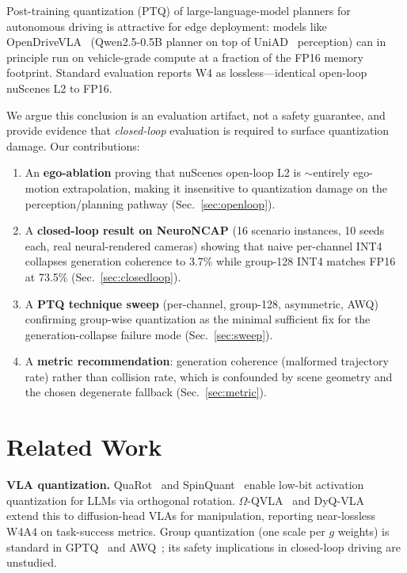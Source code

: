 \documentclass[conference]{IEEEtran}
\begin{document}
Post-training quantization (PTQ) of large-language-model planners for autonomous driving is
attractive for edge deployment: models like OpenDriveVLA~\cite{opendrivevla} (Qwen2.5-0.5B
planner on top of UniAD~\cite{uniad} perception) can in principle run on vehicle-grade compute at
a fraction of the FP16 memory footprint. Standard evaluation reports W4 as lossless---identical
open-loop nuScenes L2 to FP16.

We argue this conclusion is an evaluation artifact, not a safety guarantee, and provide evidence
that \emph{closed-loop} evaluation is required to surface quantization damage. Our contributions:
\begin{enumerate}
  \item An \textbf{ego-ablation} proving that nuScenes open-loop L2 is $\sim$entirely ego-motion
        extrapolation, making it insensitive to quantization damage on the perception/planning
        pathway (Sec.~\ref{sec:openloop}).
  \item A \textbf{closed-loop result on NeuroNCAP} (16 scenario instances, 10 seeds each, real
        neural-rendered cameras) showing that naive per-channel INT4 collapses generation
        coherence to 3.7\% while group-128 INT4 matches FP16 at 73.5\%
        (Sec.~\ref{sec:closedloop}).
  \item A \textbf{PTQ technique sweep} (per-channel, group-128, asymmetric, AWQ) confirming
        group-wise quantization as the minimal sufficient fix for the generation-collapse failure
        mode (Sec.~\ref{sec:sweep}).
  \item A \textbf{metric recommendation}: generation coherence (malformed trajectory rate) rather
        than collision rate, which is confounded by scene geometry and the chosen degenerate
        fallback (Sec.~\ref{sec:metric}).
\end{enumerate}

\section{Related Work}
\label{sec:related}

\textbf{VLA quantization.}
QuaRot~\cite{quarot} and SpinQuant~\cite{spinquant} enable low-bit activation quantization for
LLMs via orthogonal rotation. $\Omega$-QVLA~\cite{omegaqvla} and DyQ-VLA~\cite{dyqvla} extend
this to diffusion-head VLAs for manipulation, reporting near-lossless W4A4 on task-success
metrics. Group quantization (one scale per $g$ weights) is standard in
GPTQ~\cite{gptq} and AWQ~\cite{awq}; its safety implications in closed-loop driving are unstudied.
\end{document}
